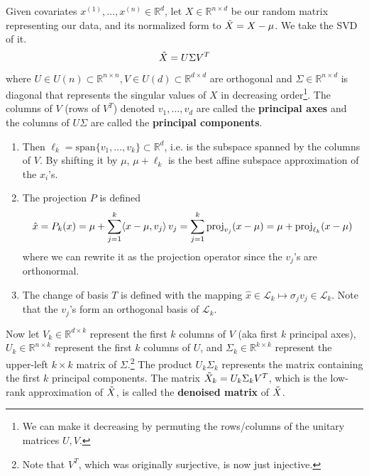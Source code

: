   \begin{theorem} 
    Given covariates $x^{(1)}, \ldots, x^{(n)} \in \mathbb{R}^{d}$, let $X \in \mathbb{R}^{n \times d}$ be our random matrix representing our data, and its normalized form to $\Tilde{X} = X - \mu$. We take the SVD of it. 
    \begin{equation}
      \Tilde{X} = U \Sigma V^T
    \end{equation}
    where $U \in U(n) \subset \mathbb{R}^{n \times n}, V \in U(d) \subset \mathbb{R}^{d \times d}$ are orthogonal and $\Sigma \in \mathbb{R}^{n \times d}$ is diagonal that represents the singular values of $X$ in decreasing order\footnote{We can make it decreasing by permuting the rows/columns of the unitary matrices $U, V$.}. The columns of $V$ (rows of $V^T$) denoted $v_1, \ldots, v_d$ are called the \textbf{principal axes} and the columns of $U\Sigma$ are called the \textbf{principal components}. 
    \begin{enumerate}
      \item Then $\ell_k = \mathrm{span}\{v_1, \ldots, v_k\} \subset \mathbb{R}^d$, i.e. is the subspace spanned by the columns of $V$. By shifting it by $\mu$, $\mu + \ell_k$ is the best affine subspace approximation of the $x_i$'s. 

      \item The projection $P$ is defined 
      \begin{equation}
        \hat{x} = P_k (x) = \mu + \sum_{j=1}^k \langle x - \mu, v_j \rangle \, v_j = \sum_{j=1}^k \operatorname{proj}_{v_j} (x - \mu) = \mu + \operatorname{proj}_{\ell_k} (x - \mu)
      \end{equation}
      where we can rewrite it as the projection operator since the $v_j$'s are orthonormal. 

    \item The change of basis $T$ is defined with the mapping $\hat{x} \in \mathcal{L}_k \mapsto \sigma_j v_j \in \mathcal{L}_k$. Note that the $v_j$'s form an orthogonal basis of $\mathcal{L}_k$. 
    \end{enumerate} 
    Now let $V_k \in \mathbb{R}^{d \times k}$ represent the first $k$ columns of $V$ (aka first $k$ principal axes), $U_k \in \mathbb{R}^{n \times k}$ represent the first $k$ columns of $U$, and $\Sigma_k \in \mathbb{R}^{k \times k}$ represent the upper-left $k \times k$ matrix of $\Sigma$.\footnote{Note that $V^T$, which was originally surjective, is now just injective.} The product $U_k \Sigma_k$ represents the matrix containing the first $k$ principal components. The matrix $\Tilde{X}_k = U_k \Sigma_k V^T$, which is the low-rank approximation of $\Tilde{X}$, is called the \textbf{denoised matrix} of $\Tilde{X}$. 
  \end{theorem}
